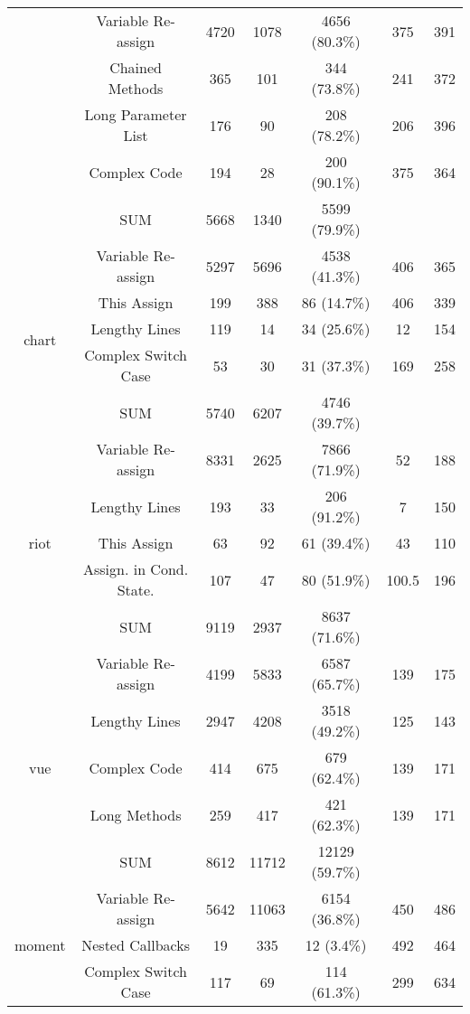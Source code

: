 {\begin{table*}[!htbp]
\begin{tabular}{c|c|c|c|c|c|c}
		& Variable Re-assign & 4720 & 1078 & 4656 (80.3\%) & 375 & 391 \\ \cline{2-7}
		& Chained Methods & 365 & 101 & 344 (73.8\%) & 241 & 372 \\ \cline{2-7}
		& Long Parameter List & 176 & 90 & 208 (78.2\%) & 206 & 396 \\ \cline{2-7}
		& Complex Code & 194 & 28 & 200 (90.1\%) & 375 & 364 \\ \cline{2-7}
		& SUM & 5668 & 1340 & 5599 (79.9\%) & & \\ \hline
		\multirow{5}{*}{chart}
		& Variable Re-assign & 5297 & 5696 & 4538 (41.3\%) & 406 & 365 \\ \cline{2-7}
		& This Assign & 199 & 388 & 86 (14.7\%) & 406 & 339 \\ \cline{2-7}
		& Lengthy Lines & 119 & 14 & 34 (25.6\%) & 12 & 154 \\ \cline{2-7}
		& Complex Switch Case & 53 & 30 & 31 (37.3\%) & 169 & 258 \\ \cline{2-7}
		& SUM & 5740 & 6207 & 4746 (39.7\%) & & \\ \hline
		\multirow{5}{*}{riot}
		& Variable Re-assign & 8331 & 2625 & 7866 (71.9\%) & 52 & 188 \\ \cline{2-7}
		& Lengthy Lines & 193 & 33 & 206 (91.2\%) & 7 & 150 \\ \cline{2-7}
		& This Assign & 63 & 92 & 61 (39.4\%) & 43 & 110 \\ \cline{2-7}
		& Assign. in Cond. State. & 107 & 47 & 80 (51.9\%) & 100.5 & 196 \\ \cline{2-7}
		& SUM & 9119 & 2937 & 8637 (71.6\%) & & \\ \hline
		\multirow{5}{*}{vue}
		& Variable Re-assign & 4199 & 5833 & 6587 (65.7\%) & 139 & 175 \\ \cline{2-7}
		& Lengthy Lines & 2947 & 4208 & 3518 (49.2\%) & 125 & 143 \\ \cline{2-7}
		& Complex Code & 414 & 675 & 679 (62.4\%) & 139 & 171 \\ \cline{2-7}
		& Long Methods & 259 & 417 & 421 (62.3\%) & 139 & 171 \\ \cline{2-7}
		& SUM & 8612 & 11712 & 12129 (59.7\%) & & \\ \hline
		\multirow{5}{*}{moment}
		& Variable Re-assign & 5642 & 11063 & 6154 (36.8\%) & 450 & 486 \\ \cline{2-7}
		& Nested Callbacks & 19 & 335 & 12 (3.4\%) & 492 & 464 \\ \cline{2-7}
		& Complex Switch Case & 117 & 69 & 114 (61.3\%) & 299 & 634 \\ \cline{2-7}

\end{tabular}
\end{table*}}
